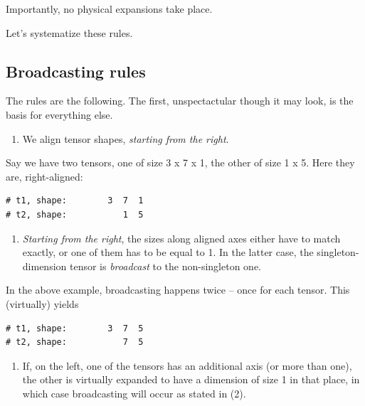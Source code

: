 \documentclass[
  letterpaper,
]{krantz}
\providecommand{\tightlist}{%
  \setlength{\itemsep}{0pt}\setlength{\parskip}{0pt}}\usepackage{longtable,booktabs,array}
\begin{document}
Importantly, no physical expansions take place.

Let's systematize these rules.

\hypertarget{broadcasting-rules}{%
\subsection{Broadcasting rules}\label{broadcasting-rules}}

The rules are the following. The first, unspectactular though it may
look, is the basis for everything else.

\begin{enumerate}
\def\labelenumi{(\arabic{enumi})}
\tightlist
\item
  We align tensor shapes, \emph{starting from the right}.
\end{enumerate}

Say we have two tensors, one of size 3 x 7 x 1, the other of size 1 x 5.
Here they are, right-aligned:

\begin{verbatim}
# t1, shape:        3  7  1
# t2, shape:           1  5
\end{verbatim}

\begin{enumerate}
\def\labelenumi{(\arabic{enumi})}
\setcounter{enumi}{1}
\tightlist
\item
  \emph{Starting from the right}, the sizes along aligned axes either
  have to match exactly, or one of them has to be equal to 1. In the
  latter case, the singleton-dimension tensor is \emph{broadcast} to the
  non-singleton one.
\end{enumerate}

In the above example, broadcasting happens twice -- once for each
tensor. This (virtually) yields

\begin{verbatim}
# t1, shape:        3  7  5
# t2, shape:           7  5
\end{verbatim}

\begin{enumerate}
\def\labelenumi{(\arabic{enumi})}
\setcounter{enumi}{2}
\tightlist
\item
  If, on the left, one of the tensors has an additional axis (or more
  than one), the other is virtually expanded to have a dimension of size
  1 in that place, in which case broadcasting will occur as stated in
  (2).
\end{enumerate}
\end{document}
